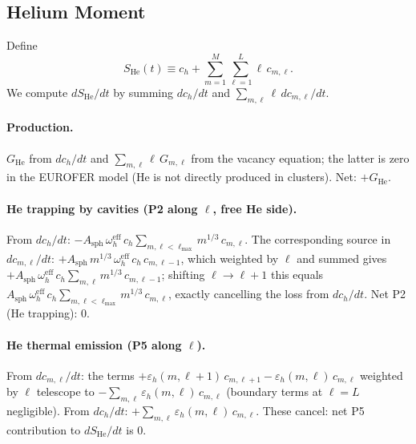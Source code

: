 \documentclass[pdflatex,sn-basic]{sn-jnl} %
\begin{document}
\subsection{Helium Moment}
\label{app:He}

Define
\begin{equation}
    S_{\mathrm{He}}(t)
    \equiv c_h + \sum_{m=1}^{M}\sum_{\ell=1}^{L}\ell\,c_{m,\ell}.
\end{equation}
We compute $dS_{\mathrm{He}}/dt$ by summing $dc_h/dt$ and
$\sum_{m,\ell}\ell\,dc_{m,\ell}/dt$.

\paragraph{Production.}
$G_{\mathrm{He}}$ from $dc_h/dt$ and $\sum_{m,\ell}\ell\,G_{m,\ell}$ from
the vacancy equation; the latter is zero in the EUROFER model (He is not
directly produced in clusters). Net: $+G_{\mathrm{He}}$.

\paragraph{He trapping by cavities (P2 along $\ell$, free He side).}
From $dc_h/dt$: $-A_{\mathrm{sph}}\,\omega_h^{\mathrm{eff}}\,c_h
\sum_{m,\ell<\ell_{\max}}m^{1/3}\,c_{m,\ell}$.
The corresponding source in $dc_{m,\ell}/dt$: $+A_{\mathrm{sph}}\,m^{1/3}
\,\omega_h^{\mathrm{eff}}\,c_h\,c_{m,\ell-1}$, which weighted by $\ell$ and
summed gives $+A_{\mathrm{sph}}\,\omega_h^{\mathrm{eff}}\,c_h\sum_{m,\ell}
m^{1/3}\,c_{m,\ell-1}$; shifting $\ell \to \ell+1$ this equals
$A_{\mathrm{sph}}\,\omega_h^{\mathrm{eff}}\,c_h\sum_{m,\ell < \ell_{\max}}
m^{1/3}\,c_{m,\ell}$, exactly cancelling the loss from $dc_h/dt$. Net P2
(He trapping): $0$. \checkmark

\paragraph{He thermal emission (P5 along $\ell$).}
From $dc_{m,\ell}/dt$: the terms $+\varepsilon_h(m,\ell{+}1)\,c_{m,\ell+1}
- \varepsilon_h(m,\ell)\,c_{m,\ell}$ weighted by $\ell$ telescope to
$-\sum_{m,\ell}\varepsilon_h(m,\ell)\,c_{m,\ell}$ (boundary terms at
$\ell=L$ negligible). From $dc_h/dt$: $+\sum_{m,\ell}\varepsilon_h(m,\ell)
\,c_{m,\ell}$. These cancel: net P5 contribution to $dS_{\mathrm{He}}/dt$
is $0$. \checkmark
\end{document}
